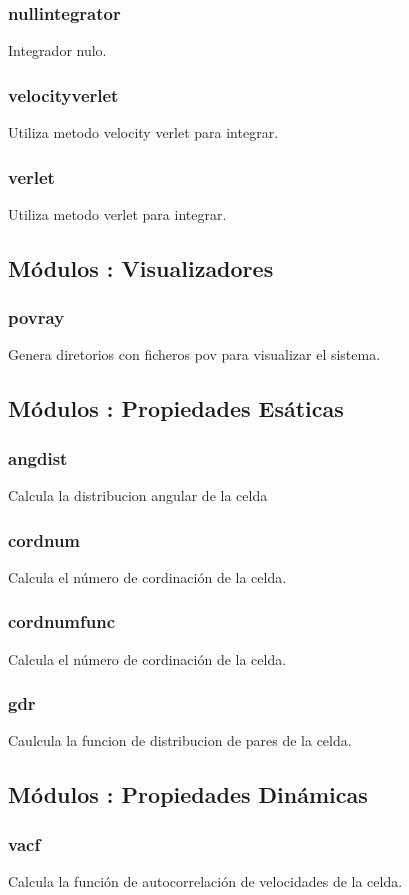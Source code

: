 \documentclass[a4paper,10pt]{scrbook}
\begin{document}
\subsubsection{nullintegrator}
Integrador nulo.
\subsubsection{velocityverlet}
Utiliza metodo velocity verlet para integrar.
\subsubsection{verlet}
Utiliza metodo verlet para integrar.

\subsection{M\'odulos : Visualizadores}
\subsubsection{povray}
Genera diretorios con ficheros pov para visualizar el sistema.

\subsection{M\'odulos : Propiedades Es\'aticas}
\subsubsection{angdist}
Calcula la distribucion angular de la celda
\subsubsection{cordnum}
Calcula el n\'umero de cordinaci\'on de la celda.
\subsubsection{cordnumfunc}
Calcula el n\'umero de cordinaci\'on de la celda.
\subsubsection{gdr}
Caulcula la funcion de distribucion de pares de la celda.

\subsection{M\'odulos : Propiedades Din\'amicas}
\subsubsection{vacf}
Calcula la funci\'on de autocorrelaci\'on de velocidades de la celda.
\end{document}
